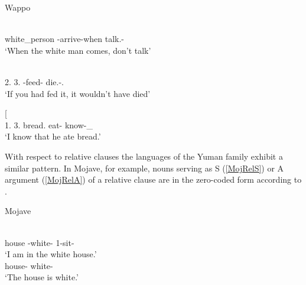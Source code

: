 \begin{exe}\ex\label{WapTempCl} {Wappo} \citetext{\citealt[71, 77]{Thompsonetal:2006}, \citealt[239]{Adverbial}}\nopagebreak[4]
\begin{xlist}
\ex\gll  {\rm[}  \textipa{tu-lePa-cel'}{\rm]} \\
\dem{} white\_person \dir{}-arrive-when talk.\ipfv{}-\Neg{}\\
`When the white man comes, don't talk' %

\ex\gll  {\rm[}   \textipa{cel'}{\rm]}  \\
2\sg{}.\acc{} 3\sg{}.\acc{} \uop{}-feed-\caus{} \cond{} \opt{} die.\imp{}-\Neg{}.\Hyp{}\\
`If you had fed it, it wouldn't have died' %

\ex\gll{}  {\rm[}\textbf{}  \textipa{paP-tah}{\rm]} \\
1\sg{}.\nom{} 3\sg{}.\acc{} bread.\acc{} eat-\pst{} know-\Non\_\fut{}\\
`I know that he ate bread.' 
\end{xlist}
\end{exe}

With respect to relative clauses the languages of the Yuman family exhibit a similar pattern.
In Mojave, for example, nouns serving as S (\ref{MojRelS}) or A argument (\ref{MojRelA}) of a relative clause are in the zero-coded form according to \citet[187--190]{Munro:1976}.

\begin{exe}\ex\label{MojRelS} {Mojave} \citep[Yuman; Arizona; ][188]{Munro:1976}\nopagebreak[4]
\begin{xlist}
\ex\gll  {\rm[} \textipa{k\super{w}-n\super{y}@m@savc{\rm]}-l\super{y}} \\
house \relativ{}-white-\loc{} 1-sit-\tns{}\\
`I am in the white house.'
\ex\gll {} \\
house-\nom{} white-\tns{}\\
`The house is white.'
\end{xlist}
\end{exe}

